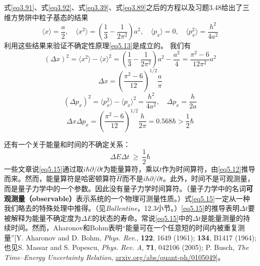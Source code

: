 \documentclass[12pt,a4paper,openany]{ctexbook}
\newcommand{\dlt}{\Delta}
\begin{document}
\begin{flushleft}
\begin{examplebox}
    式\eqref{eq3.91}、式\eqref{eq3.92}、式\eqref{eq3.39}、式\eqref{eq3.89}之后的方程以及习题3.48给出了三维方势阱中粒子基态的结果
    \begin{equation*}
    \langle x \rangle = \frac {a}{2}, \quad \langle x^2 \rangle = \left(\frac {1}{3} - \frac {1}{2\pi^2} \right) a^2, \quad \langle p_x \rangle = 0, \quad \langle p_x^2 \rangle = \frac {h^2}{4a^2}
    \end{equation*}
    利用这些结果来验证不确定性原理\eqref{eq5.13}是成立的。
    我们有
    \begin{equation*}
        (\Delta x)^2 = \langle x^2 \rangle - \langle x \rangle^2 = \left( \frac {1}{3} - \frac {1}{2\pi^2} \right) a^2 - \frac {a^2}{4} = \frac {\pi^2 - 6}{12\pi^2} a^2
    \end{equation*}
    \begin{equation*}
        \Delta x = \left( \frac{\pi^2 - 6}{12} \right)^{1/2} \frac{a}{\pi}
    \end{equation*}
    \begin{equation*}
        (\Delta p_x)^2 = \langle p_x^2 \rangle - \langle p_x \rangle^2 = \frac{h^2}{4a^2}, \quad \Delta p_x = \frac{h}{2a}
    \end{equation*}
    \begin{equation*}
        \Delta x \Delta p_x = \left( \frac{\pi^2 - 6}{12} \right)^{1/2} \frac{h}{2\pi} = 0.568\hbar > \frac{1}{2}\hbar
    \end{equation*}
\end{examplebox}


还有一个关于能量和时间的不确定关系：
\begin{equation}
    \dlt E\dlt t\ \geq\ \frac{1}{2}\hbar \label{eq5.15}
\end{equation}
一些文章说\eqref{eq5.15}通过取$i\hbar\partial/\partial t$为能量算符，乘以$t$作为时间算符，由\eqref{eq5.12}推导而来。然而，能量算符是哈密顿算符$\hat{H}$而不是$i\hbar\partial/\partial t$。此外，时间不是可观测量，而是量子力学中的一个参数。因此没有量子力学时间算符。（量子力学中的名词\textbf{可观测量（observable）}表示系统的一个物理可测量性质。）式\eqref{eq5.15}一定从一种我们略去的特殊处理中推得。（见\textit{Ballentine}，12.3小节。）\eqref{eq5.15}的推导表明$\dlt t$要被解释为能量不确定度为$\dlt E$的状态的寿命。常说\eqref{eq5.15}中的$\dlt t$是能量测量的持续时间。然而，Aharonov和Bohm表明“能量可在一个任意短的时间内被重复测量”[Y. Aharonov and D. Bohm, \textit{Phys. Rev.}, \textbf{122}, 1649 (1961); \textbf{134}, B1417 (1964); 也见S. Massar and S. Popescu, \textit{Phys. Rev. A}, \textbf{71}, 042106 (2005); P. Busch, \textit{The Time–Energy Uncertainty Relation}, \url{arxiv.org/abs/quant-ph/0105049}]。


\end{flushleft}
\end{document}
